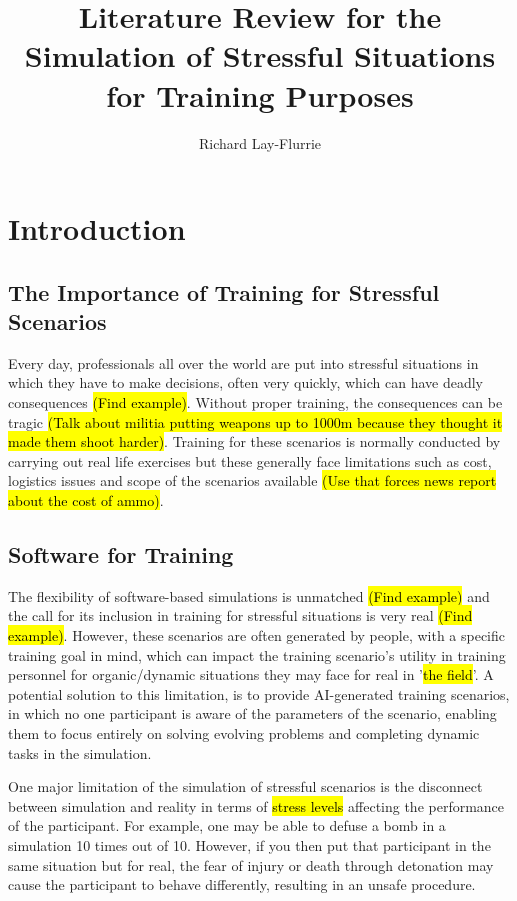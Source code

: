 \documentclass{article}
\title{Literature Review for the Simulation of Stressful Situations for Training Purposes}
\author{Richard Lay-Flurrie}
\begin{document}
\maketitle

\tableofcontents


\section{Introduction}

\subsection{The Importance of Training for Stressful Scenarios}

Every day, professionals all over the world are put into stressful situations in which they have to make decisions, often very quickly, which can have deadly consequences \hl{(Find example)}. Without proper training, the consequences can be tragic \hl{(Talk about militia putting weapons up to 1000m because they thought it made them shoot harder)}. Training for these scenarios is normally conducted by carrying out real life exercises but these generally face limitations such as cost, logistics issues and scope of the scenarios available \hl{(Use that forces news report about the cost of ammo)}.

\subsection{Software for Training}

The flexibility of software-based simulations is unmatched \hl{(Find example)} and the call for its inclusion in training for stressful situations is very real \hl{(Find example)}. However, these scenarios are often generated by people, with a specific training goal in mind, which can impact the training scenario's utility in training personnel for organic/dynamic situations they may face for real in '\hl{the field}'. A potential solution to this limitation, is to provide AI-generated training scenarios, in which no one participant is aware of the parameters of the scenario, enabling them to focus entirely on solving evolving problems and completing dynamic tasks in the simulation.

One major limitation of the simulation of stressful scenarios is the disconnect between simulation and reality in terms of \hl{stress levels} affecting the performance of the participant. For example, one may be able to defuse a bomb in a simulation 10 times out of 10. However, if you then put that participant in the same situation but for real, the fear of injury or death through detonation may cause the participant to behave differently, resulting in an unsafe procedure.
\end{document}
